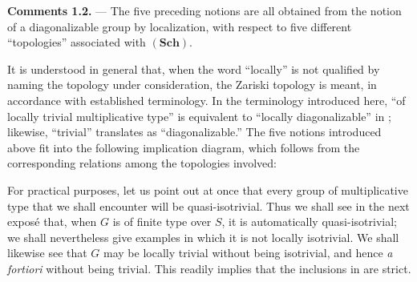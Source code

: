\medskip
\noindent{}\textbf{Comments 1.2.} ---
The five preceding notions are all obtained from the notion of a
diagonalizable group by localization, with respect to five different
``topologies'' associated with \((\mathbf{Sch})\).

It is understood in general that, when the word ``locally'' is not
qualified by naming the topology under consideration, the Zariski
topology is meant, in accordance with established terminology. In the
terminology introduced here, ``of locally trivial multiplicative type''
is equivalent to ``locally diagonalizable'' in ; likewise,
``trivial'' translates as ``diagonalizable.'' The five notions introduced
above fit into the following implication diagram, which follows from the
corresponding relations among the topologies involved:

\begin{center}
\end{center}

For practical purposes, let us point out at once that every group of
multiplicative type that we shall encounter will be quasi-isotrivial. Thus
we shall see in the next exposé that, when \(G\) is of finite type
over \(S\), it is automatically quasi-isotrivial; we shall nevertheless
give examples in which it is not locally isotrivial. We shall likewise see
that \(G\) may be locally trivial without being isotrivial, and hence
\emph{a fortiori} without being trivial. This readily implies that the
inclusions in  are strict.

